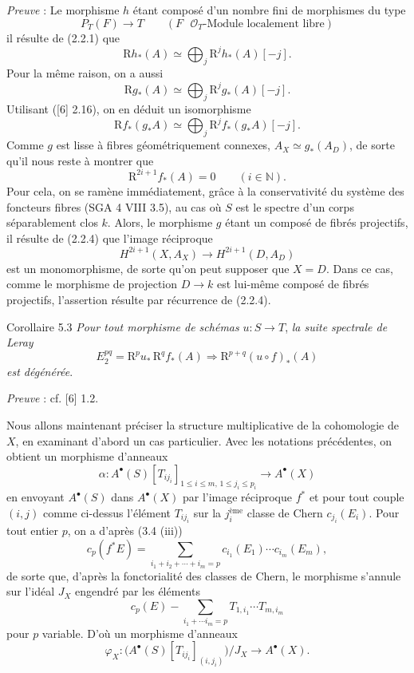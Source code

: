 \emph{Preuve} : Le morphisme $h$ étant composé d'un nombre fini de morphismes du type
\[
P_T(F)\to T\qquad (F\text{ }\mathcal{O}_T\text{-Module localement libre})
\tag{Q}
\]
il résulte de (2.2.1) que
\[
\mathrm{R} h_*(A)\simeq\bigoplus_j \mathrm{R}^jh_*(A)[-j].
\]
Pour la même raison, on a aussi
\[
\mathrm{R} g_*(A)\simeq\bigoplus_j \mathrm{R}^jg_*(A)[-j].
\]
Utilisant ([6] 2.16), on en déduit un isomorphisme
\[
\mathrm{R} f_*(g_*A)\simeq\bigoplus_j \mathrm{R}^j f_*(g_*A)[-j].
\]
Comme $g$ est lisse à fibres géométriquement connexes, $A_X\simeq g_*(A_D)$, de sorte qu'il nous reste à montrer que
\[
\mathrm{R}^{2i+1}f_*(A)=0\qquad (i\in\mathbb{N}).
\tag{5.2.1}
\]
Pour cela, on se ramène immédiatement, grâce à la conservativité du système des foncteurs fibres (SGA 4 VIII 3.5), au cas où $S$ est le spectre d'un corps séparablement clos $k$. Alors, le morphisme $g$ étant un composé de fibrés projectifs, il résulte de (2.2.4) que l'image réciproque
\[
H^{2i+1}(X,A_X)\to H^{2i+1}(D,A_D)
\]
est un monomorphisme, de sorte qu'on peut supposer que $X=D$. Dans ce cas, comme le
morphisme de projection $D\to k$ est lui-même composé de fibrés projectifs, l'assertion résulte par récurrence de (2.2.4).

\begin{statement}{Corollaire 5.3}
\emph{Pour tout morphisme de schémas} $u:S\to T$, \emph{la suite spectrale de Leray}
\[
E_2^{pq}=\mathrm{R}^p u_*\,\mathrm{R}^q f_*(A)\Rightarrow \mathrm{R}^{p+q}(u\circ f)_*(A)
\]
\emph{est dégénérée}.
\end{statement}

\emph{Preuve} : cf. [6] 1.2.

Nous allons maintenant préciser la structure multiplicative de la cohomologie de $X$, en examinant d'abord un cas particulier. Avec les notations précédentes, on obtient un morphisme d'anneaux
\[
\alpha:A^{\bullet}(S)[T_{ij_i}]_{1\le i\le m,\,1\le j_i\le p_i}\to A^{\bullet}(X)
\]
en envoyant $A^{\bullet}(S)$ dans $A^{\bullet}(X)$ par l'image réciproque $f^*$ et pour tout couple $(i,j)$ comme ci-dessus l'élément $T_{ij_i}$ sur la $j_i^{\text{ème}}$ classe de Chern $c_{j_i}(E_i)$. Pour tout entier $p$, on a d'après (3.4 (iii))
\[
c_p(f^*E)=\sum_{i_1+i_2+\cdots+i_m=p}c_{i_1}(E_1)\cdots c_{i_m}(E_m),
\]
de sorte que, d'après la fonctorialité des classes de Chern, le morphisme s'annule sur l'idéal $J_X$ engendré par les éléments
\[
c_p(E)-\sum_{i_1+\cdots i_m=p}T_{1,i_1}\cdots T_{m,i_m}
\]
pour $p$ variable. D'où un morphisme d'anneaux
\[
\varphi_X:\bigl(A^{\bullet}(S)[T_{ij_i}]_{(i,j_i)}\bigr)/J_X\to A^{\bullet}(X).
\]

